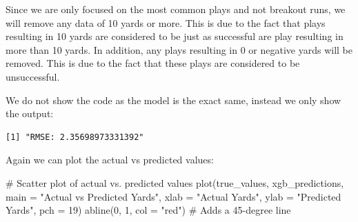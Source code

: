 \documentclass[
  super,
  preprint,
  3p]{elsarticle}
\newenvironment{Shaded}{\begin{snugshade}}{\end{snugshade}}
\newcommand{\AttributeTok}[1]{\textcolor[rgb]{0.40,0.45,0.13}{#1}}
\newcommand{\CommentTok}[1]{\textcolor[rgb]{0.37,0.37,0.37}{#1}}
\newcommand{\DecValTok}[1]{\textcolor[rgb]{0.68,0.00,0.00}{#1}}
\newcommand{\FunctionTok}[1]{\textcolor[rgb]{0.28,0.35,0.67}{#1}}
\newcommand{\NormalTok}[1]{\textcolor[rgb]{0.00,0.23,0.31}{#1}}
\newcommand{\OtherTok}[1]{\textcolor[rgb]{0.00,0.23,0.31}{#1}}
\newcommand{\SpecialCharTok}[1]{\textcolor[rgb]{0.37,0.37,0.37}{#1}}
\newcommand{\StringTok}[1]{\textcolor[rgb]{0.13,0.47,0.30}{#1}}
\begin{document}
Since we are only focused on the most common plays and not breakout
runs, we will remove any data of 10 yards or more. This is due to the
fact that plays resulting in 10 yards are considered to be just as
successful are play resulting in more than 10 yards. In addition, any
plays resulting in 0 or negative yards will be removed. This is due to
the fact that these plays are considered to be unsuccessful.

\begin{Shaded}
\end{Shaded}

We do not show the code as the model is the exact same, instead we only
show the output:

\begin{verbatim}
[1] "RMSE: 2.35698973331392"
\end{verbatim}

Again we can plot the actual vs predicted values:

\begin{Shaded}
\begin{Highlighting}[]
\CommentTok{\# Scatter plot of actual vs. predicted values}
\FunctionTok{plot}\NormalTok{(true\_values, xgb\_predictions, }\AttributeTok{main =} \StringTok{"Actual vs Predicted Yards"}\NormalTok{, }\AttributeTok{xlab =} \StringTok{"Actual Yards"}\NormalTok{, }\AttributeTok{ylab =} \StringTok{"Predicted Yards"}\NormalTok{, }\AttributeTok{pch =} \DecValTok{19}\NormalTok{)}
\FunctionTok{abline}\NormalTok{(}\DecValTok{0}\NormalTok{, }\DecValTok{1}\NormalTok{, }\AttributeTok{col =} \StringTok{"red"}\NormalTok{)  }\CommentTok{\# Adds a 45{-}degree line}
\end{Highlighting}
\end{Shaded}
\end{document}

